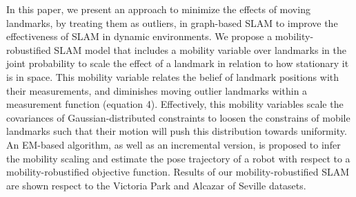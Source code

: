 
In this paper, we present an approach to minimize the effects of
moving landmarks, by treating them as outliers, in graph-based SLAM to
improve the effectiveness of SLAM in dynamic environments.  We
propose a mobility-robustified SLAM model that includes a mobility
variable over landmarks in the joint probability to scale the effect
of a landmark in relation to how stationary it is in space.  This
mobility variable relates the belief of landmark positions with their
measurements, and diminishes moving outlier landmarks within a
measurement function (equation 4).
Effectively, this mobility variables scale the covariances
of Gaussian-distributed constraints to loosen the constrains of mobile landmarks such that their motion will push this distribution towards uniformity.
  An EM-based algorithm, as well as
an incremental version, is proposed to infer the mobility scaling
and estimate the pose trajectory of a robot with respect to a
mobility-robustified objective function. Results of our
mobility-robustified SLAM are shown respect to the
Victoria Park \cite{isam} and Alcazar of Seville \cite{iros14-frog} datasets.
